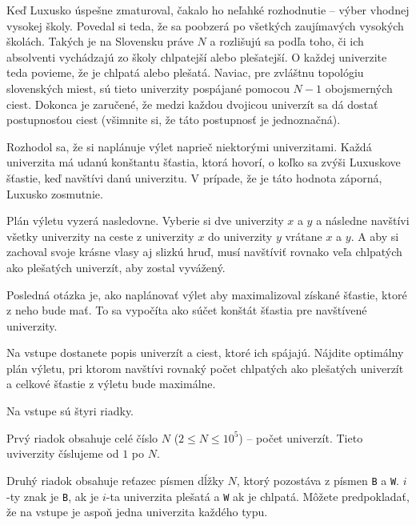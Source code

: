 





Keď Luxusko úspešne zmaturoval, čakalo ho neľahké rozhodnutie -- výber vhodnej vysokej školy.
Povedal si teda, že sa poobzerá po všetkých zaujímavých vysokých školách. Takých je na Slovensku
práve $N$ a rozlišujú sa podľa toho, či ich absolventi vychádzajú zo školy chlpatejší alebo
plešatejší. O každej univerzite teda povieme, že je chlpatá alebo plešatá. Naviac, pre zvláštnu
topológiu slovenských miest, sú tieto univerzity pospájané pomocou $N-1$ obojsmerných ciest. Dokonca
je zaručené, že medzi každou dvojicou univerzít sa dá dostať postupnosťou ciest (všimnite si, že
táto postupnosť je jednoznačná).

Rozhodol sa, že si naplánuje výlet naprieč niektorými univerzitami. Každá univerzita má udanú
konštantu šťastia, ktorá hovorí, o koľko sa zvýši Luxuskove šťastie, keď navštívi danú univerzitu. V
prípade, že je táto hodnota záporná, Luxusko zosmutnie.

Plán výletu vyzerá nasledovne. Vyberie si dve univerzity $x$ a $y$ a následne navštívi všetky
univerzity na ceste z univerzity $x$ do univerzity $y$ vrátane $x$ a $y$. A aby si zachoval svoje
krásne vlasy aj slizkú hruď, musí navštíviť rovnako veľa chlpatých ako plešatých univerzít, aby
zostal vyvážený.

Posledná otázka je, ako naplánovať výlet aby maximalizoval získané šťastie, ktoré z neho bude mať.
To sa vypočíta ako súčet konštát šťastia pre navštívené univerzity.


Na vstupe dostanete popis univerzít a ciest, ktoré ich spájajú. Nájdite optimálny plán výletu, pri
ktorom navštívi rovnaký počet chlpatých ako plešatých univerzít a celkové šťastie z výletu bude
maximálne.


Na vstupe sú štyri riadky.

Prvý riadok obsahuje celé číslo $N$ ($2 \leq N \leq 10^5$) -- počet univerzít. Tieto uviverzity
číslujeme od $1$ po $N$.

Druhý riadok obsahuje reťazec písmen dĺžky $N$, ktorý pozostáva z písmen \texttt{B} a \texttt{W}.
$i$-ty znak je \texttt{B}, ak je $i$-ta univerzita plešatá a \texttt{W} ak je chlpatá. Môžete
predpokladať, že na vstupe je aspoň jedna univerzita každého typu.

